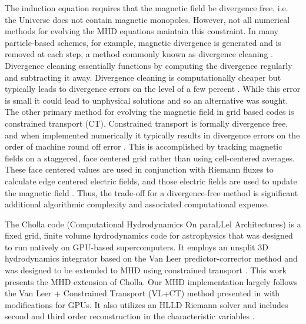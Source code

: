 The induction equation requires that the magnetic field be divergence free, i.e. the Universe does not contain magnetic monopoles. However, not all numerical methods for evolving the MHD equations maintain this constraint. In many particle-based schemes, for example, magnetic divergence is generated and is removed at each step, a method commonly known as divergence cleaning \citep{dedner_hyperbolic_2002}. Divergence cleaning essentially functions by computing the divergence regularly and subtracting it away. Divergence cleaning is computationally cheaper but typically leads to divergence errors on the level of a few percent \citep{pakmor_magnetizing_2020,van_de_voort_effect_2021}. While this error is small it could lead to unphysical solutions and so an alternative was sought. The other primary method for evolving the magnetic field in grid based codes is constrained transport (CT). Constrained transport is formally divergence free, and when implemented numerically it typically results in divergence errors on the order of machine round off error \citep{evans_1988,stone_athena_2008, stone_2009}. This is accomplished by tracking magnetic fields on a staggered, face centered grid rather than using cell-centered averages. These face centered values are used in conjunction with Riemann fluxes to calculate edge centered electric fields, and those electric fields are used to update the magnetic field \citep{evans_1988,stone_athena_2008, stone_2009}. Thus, the trade-off for a divergence-free method is significant additional algorithmic complexity and associated computational expense.

The Cholla code (Computational Hydrodynamics On paraLLel Architectures) \citep{schneider_2015} is a fixed grid, finite volume hydrodynamics code for astrophysics that was designed to run natively on GPU-based supercomputers. It employs an unsplit 3D hydrodynamics integrator based on the Van Leer predictor-corrector method \citep{falle_1991, van_leer_2006} and was designed to be extended to MHD using constrained transport \citep{evans_1988, stone_athena_2008}. This work presents the MHD extension of Cholla. Our MHD implementation largely follows the Van Leer + Constrained Transport (VL+CT) method presented in \cite{stone_2009} with modifications for GPUs. It also utilizes an HLLD Riemann solver \citep{hlld_2005} and includes second \citep{stone_2009} and third \citep{felker_2018} order reconstruction in the characteristic variables \citep{stone_athena_2008}.

